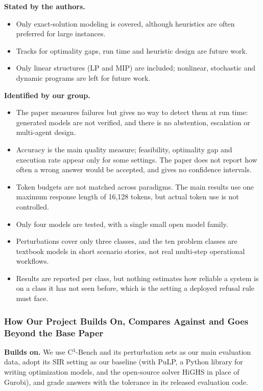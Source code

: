 \documentclass[11pt,a4paper]{article}
\newcommand{\cthree}{C$^3$-Bench}
\begin{document}
\textbf{Stated by the authors.}\par\nopagebreak
\begin{itemize}[leftmargin=1.6em, beginpenalty=10000]
\item Only exact-solution modeling is covered, although heuristics are often preferred for large instances.
\item Tracks for optimality gaps, run time and heuristic design are future work.
\item Only linear structures (LP and MIP) are included; nonlinear, stochastic and dynamic programs are left for future work.
\end{itemize}
\textbf{Identified by our group.}
\begin{itemize}[leftmargin=1.6em]
\item The paper measures failures but gives no way to detect them at run time: generated models are not verified, and there is no abstention, escalation or multi-agent design.\item Accuracy is the main quality measure; feasibility, optimality gap and execution rate appear only for some settings. The paper does not report how often a wrong answer would be accepted, and gives no confidence intervals.
\item Token budgets are not matched across paradigms. The main results use one maximum response length of 16,128 tokens, but actual token use is not controlled.
\item Only four models are tested, with a single small open model family.
\item Perturbations cover only three classes, and the ten problem classes are textbook models in short scenario stories, not real multi-step operational workflows.
\item Results are reported per class, but nothing estimates how reliable a system is on a class it has not seen before, which is the setting a deployed refusal rule must face.
\end{itemize}

\subsubsection{How Our Project Builds On, Compares Against and Goes Beyond the Base Paper}

\textbf{Builds on.} We use \cthree{} and its perturbation sets as our main evaluation data, adopt its SIR setting as our baseline (with PuLP, a Python library for writing optimization models, and the open-source solver HiGHS in place of Gurobi), and grade answers with the tolerance in its released evaluation code.
\end{document}
